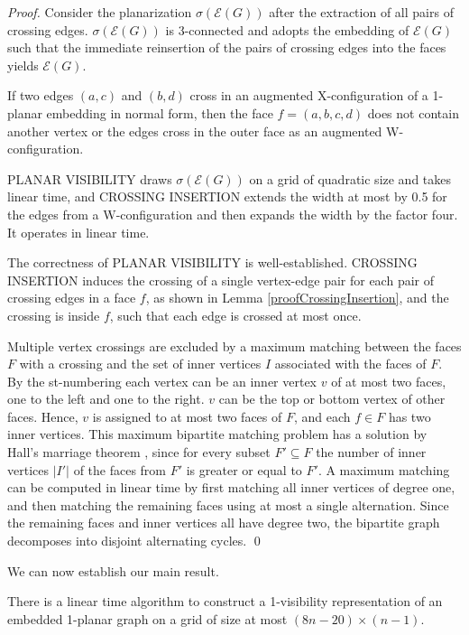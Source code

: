 \documentclass[runningheads]{llncs}
\begin{document}
\begin{proof}
Consider the planarization $\sigma(\mathcal{E}(G))$ after the
extraction of all pairs of crossing edges. $\sigma(\mathcal{E}(G))$
is  3-connected   \cite{abk-sld3c-13} and  adopts the embedding of
$\mathcal{E}(G)$ such that the immediate reinsertion of the pairs of
crossing edges into the faces yields $\mathcal{E}(G)$.

If two edges $(a,c)$ and $(b,d)$ cross in an augmented
X-configuration of a 1-planar embedding in normal form, then the
face $f = (a,b,c,d)$ does not contain another vertex  or the edges
cross in the outer face as an augmented W-configuration.

PLANAR VISIBILITY draws  $\sigma(\mathcal{E}(G))$ on a grid of
quadratic size and takes linear time, and CROSSING INSERTION extends
the width at most by 0.5 for the edges from a W-configuration and
then expands the width by the factor four. It operates in linear
time.

The correctness of PLANAR VISIBILITY is well-established. CROSSING
INSERTION induces the crossing of a single vertex-edge pair for each
pair of crossing edges in a face $f$, as shown in Lemma
\ref{proofCrossingInsertion}, and the crossing is inside $f$, such
that each edge is crossed at most once.

Multiple vertex crossings are excluded by  a maximum matching
between the faces $F$ with a crossing and the set of
 inner vertices $I$ associated with the faces of $F$.
By the st-numbering each vertex can be an inner vertex $v$ of at
most two faces, one to the left and one to the right. $v$ can be the
top or bottom vertex of   other faces. Hence, $v$ is assigned to at
most two faces of $F$, and each $f \in F$ has two inner vertices.
This maximum bipartite matching problem has a solution by Hall's
marriage theorem \cite{h-matching-35}, since for every subset $F'
\subseteq F$ the number of inner vertices $|I'|$ of the faces from
$F'$ is greater or equal to $F'$. A maximum matching can be computed
in linear time by first matching all inner vertices of degree one,
and then matching the remaining faces using at most a single
alternation. Since the remaining faces and inner vertices all have
degree two, the bipartite graph decomposes into disjoint alternating
cycles. \qed
\end{proof}

\fi



We can now establish our main result.

\begin{theorem}

There is a linear time algorithm to construct a 1-visibility
representation of an embedded 1-planar graph on a grid of size at
most $(8n-20) \times (n-1)$.
\end{theorem}
\end{document}

